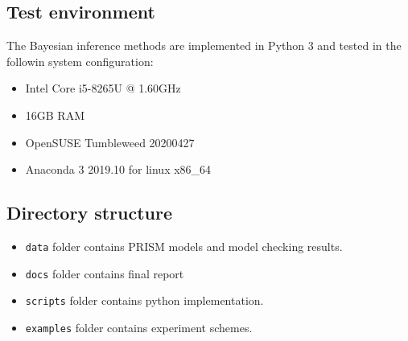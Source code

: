 \documentclass[12pt]{article}
\theoremstyle{definition}
\begin{document}
\subsection{Test environment}
The Bayesian inference methods are implemented in Python 3 and tested in the
followin system configuration:
\begin{itemize}
\item Intel Core i5-8265U @ 1.60GHz
\item 16GB RAM
\item OpenSUSE Tumbleweed 20200427
\item Anaconda 3 2019.10 for linux x86\_64
\end{itemize}

\subsection{Directory structure}
\begin{itemize}
\item \texttt{data} folder contains PRISM models and model checking results.
\item \texttt{docs} folder contains final report
\item \texttt{scripts} folder contains python implementation.
\item \texttt{examples} folder contains experiment schemes.
\end{itemize}


\end{document}
